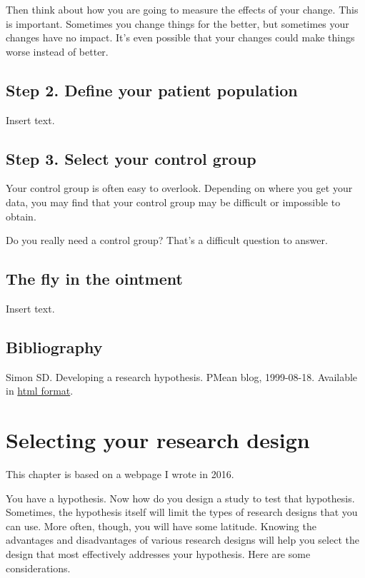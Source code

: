 \documentclass[
  letterpaper,
  DIV=11,
  numbers=noendperiod]{scrreprt}
\begin{document}
Then think about how you are going to measure the effects of your
change. This is important. Sometimes you change things for the better,
but sometimes your changes have no impact. It's even possible that your
changes could make things worse instead of better.

\section{Step 2. Define your patient
population}\label{step-2.-define-your-patient-population}

Insert text.

\section{Step 3. Select your control
group}\label{step-3.-select-your-control-group}

Your control group is often easy to overlook. Depending on where you get
your data, you may find that your control group may be difficult or
impossible to obtain.

Do you really need a control group? That's a difficult question to
answer.

\section{The fly in the ointment}\label{the-fly-in-the-ointment}

Insert text.

\section{Bibliography}\label{bibliography-2}

Simon SD. Developing a research hypothesis. PMean blog, 1999-08-18.
Available in
\href{http://pmean.com/posts/steps-in-developing-research-hypothesis/}{html
format}.


\chapter{Selecting your research
design}\label{selecting-your-research-design}

This chapter is based on a webpage I wrote in 2016.

You have a hypothesis. Now how do you design a study to test that
hypothesis. Sometimes, the hypothesis itself will limit the types of
research designs that you can use. More often, though, you will have
some latitude. Knowing the advantages and disadvantages of various
research designs will help you select the design that most effectively
addresses your hypothesis. Here are some considerations.
\end{document}
